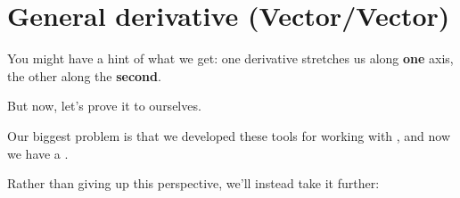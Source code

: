             
         
    \secdiv

\pagebreak
\section{General derivative (Vector/Vector)}  
        
        You might have a hint of what we get: one derivative stretches us along \textbf{one} axis, the other along the \textbf{second}.
        
        But now, let's prove it to ourselves.

        \subsecdiv

        Our biggest problem is that we developed these tools for working with , and now we have a .

        Rather than giving up this perspective, we'll instead take it further:

